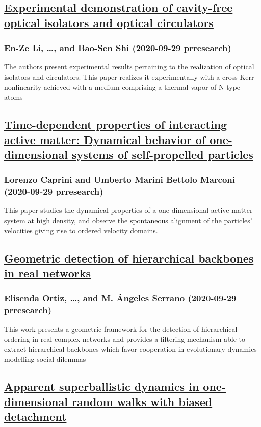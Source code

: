 \subsection*{\href{http://link.aps.org/doi/10.1103/PhysRevResearch.2.033517}{Experimental demonstration of cavity-free optical isolators and optical circulators}}
\subsubsection*{En-Ze Li, \dots, and Bao-Sen Shi (2020-09-29 prresearch)}
The authors present experimental results pertaining to the realization of optical isolators and circulators. This paper realizes it experimentally with a cross-Kerr nonlinearity achieved with a medium comprising a thermal vapor of N-type atoms
\subsection*{\href{http://link.aps.org/doi/10.1103/PhysRevResearch.2.033518}{Time-dependent properties of interacting active matter: Dynamical behavior of one-dimensional systems of self-propelled particles}}
\subsubsection*{Lorenzo Caprini and Umberto Marini Bettolo Marconi (2020-09-29 prresearch)}
This paper studies the dynamical properties of a one-dimensional active matter system at high density, and observe the spontaneous alignment of the particles’ velocities giving rise to ordered velocity domains.
\subsection*{\href{http://link.aps.org/doi/10.1103/PhysRevResearch.2.033519}{Geometric detection of hierarchical backbones in real networks}}
\subsubsection*{Elisenda Ortiz, \dots, and M. Ángeles Serrano (2020-09-29 prresearch)}
This work presents a geometric framework for the detection of hierarchical ordering in real complex networks and provides a filtering mechanism able to extract hierarchical backbones which favor cooperation in evolutionary dynamics modelling social dilemmas
\subsection*{\href{http://link.aps.org/doi/10.1103/PhysRevResearch.2.033520}{Apparent superballistic dynamics in one-dimensional random walks with biased detachment}}
